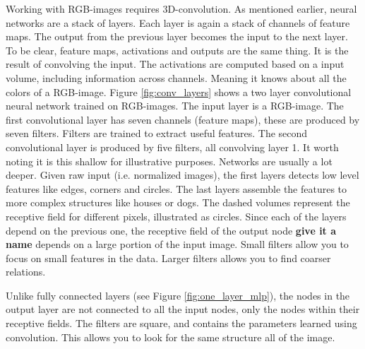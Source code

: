\documentclass{article}
\begin{document}
Working with RGB-images requires 3D-convolution. As mentioned earlier, neural networks are a stack of layers. Each layer is again a stack of channels of feature maps. The output from the previous layer becomes the input to the next layer. To be clear, feature maps, activations and outputs are the same thing. It is the result of convolving the input. The activations are computed based on a input volume, including information across channels. Meaning it knows about all the colors of a RGB-image. Figure \ref{fig:conv_layers} shows a two layer convolutional neural network trained on RGB-images. The input layer is a RGB-image. The first convolutional layer has seven channels (feature maps), these are produced by seven filters. Filters are trained to extract useful features. The second convolutional layer is produced by five filters, all convolving layer 1. It worth noting it is this shallow for illustrative purposes. Networks are usually a lot deeper. Given raw input (i.e. normalized images), the first layers detects low level features like edges, corners and circles. The last layers assemble the features to more complex structures like houses or dogs. The dashed volumes represent the receptive field for different pixels, illustrated as circles. Since each of the layers depend on the previous one, the receptive field of the output node \textbf{give it a name} depends on a large portion of the input image. Small filters allow you to focus on small features in the data. Larger filters allows you to find coarser relations. 

Unlike fully connected layers (see Figure \ref{fig:one_layer_mlp}), the nodes in the output layer are not connected to all the input nodes, only the nodes within their receptive fields. The filters are square, and contains the parameters learned using convolution. This allows you to look for the same structure all of the image. %
\end{document}
